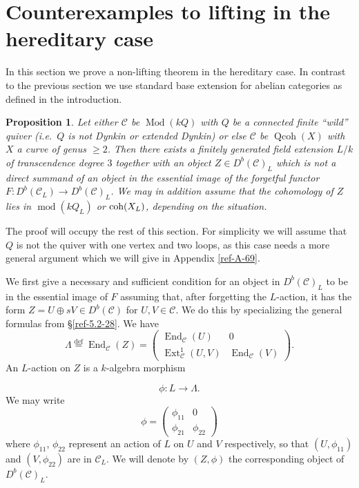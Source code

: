 \documentclass{amsart}
\numberwithin{equation}{section}
\let\cal\mathcal
\newtheorem{proposition}[lemma]{Proposition}
\theoremstyle{definition}
\theoremstyle{remark}
\begin{document}
\section{Counterexamples to lifting in the hereditary case}
In this section we prove a non-lifting theorem in the hereditary case. In contrast to the previous section we use
standard base extension for abelian categories as defined in the introduction.
\begin{proposition} \label{ref-6.1-34}
Let either ${{\cal C}}$ be ${\operatorname{Mod}}(kQ)$ with $Q$ be a connected finite ``wild'' quiver (i.e.\ $Q$ is not Dynkin or extended Dynkin) 
or else ${{\cal C}}$ be ${\operatorname{Qcoh}}(X)$ with $X$ a curve of genus $\ge 2$.
Then there exists a finitely generated field extension $L/k$
  of transcendence degree $3$ together with an object $Z\in D^b({{\cal C}})_{L}$ which is not a direct summand of an object in 
the essential image of the forgetful functor $F:D^b({{\cal C}}_{L}){\rightarrow} D^b({{\cal C}})_{L}$. We may in addition
assume that the cohomology of $Z$ lies in ${\operatorname{mod}}(kQ_L)$ or ${\mathop{\text{\upshape{coh}}}}(X_L)$, depending on the situation.
\end{proposition}
The proof will occupy the rest of this section.   
For simplicity we will assume that~$Q$ is not the quiver with one vertex and two loops, as this 
case needs a more general argument which we will give in Appendix \ref{ref-A-69}.

We first give a necessary and sufficient condition for an object in $D^b({{\cal C}})_L$ to be in the
essential image of $F$ assuming that, after forgetting the $L$-action, it has the form $Z=U\oplus
sV\in D^b({{\cal C}})$ for $U,V\in {{\cal C}}$. We do this by specializing the general formulas
from \S\ref{ref-5.2-28}. We have
\[
\Lambda\overset{\text{def}}{=}{\operatorname {End}}_{{\cal C}}(Z)=
\begin{pmatrix}
{\operatorname {End}}_{{\cal C}}(U)&0\\
{\operatorname {Ext}}^1_{{\cal C}}(U,V) & {\operatorname {End}}_{{\cal C}}(V)
\end{pmatrix}.
\]
An $L$-action on $Z$ is a $k$-algebra morphism 

\[
\phi:L{\rightarrow} \Lambda.
\]
We may write
\[
\phi=\begin{pmatrix}
\phi_{11}&0\\
\phi_{21}&\phi_{22}
\end{pmatrix}
\]
where $\phi_{11}$, $\phi_{22}$ represent an action of $L$ on $U$ and
$V$ respectively, so that $(U,\phi_{11})$ and $(V,\phi_{22})$ are in
${{\cal C}}_L$.  We will denote by $(Z,\phi)$ the corresponding object of
$D^b({{\cal C}})_L$.
\end{document}

